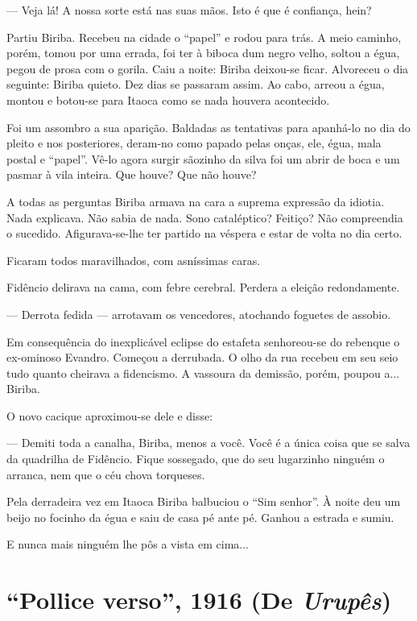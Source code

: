 --- Veja lá! A nossa sorte está nas suas mãos. Isto é que é confiança,
hein?

Partiu Biriba. Recebeu na cidade o ``papel'' e rodou para trás. A meio
caminho, porém, tomou por uma errada, foi ter à biboca dum negro velho,
soltou a égua, pegou de prosa com o gorila. Caiu a noite: Biriba
deixou-se ficar. Alvoreceu o dia seguinte: Biriba quieto. Dez dias se
passaram assim. Ao cabo, arreou a égua, montou e botou-se para Itaoca
como se nada houvera acontecido.

Foi um assombro a sua aparição. Baldadas as tentativas para apanhá-lo no
dia do pleito e nos posteriores, deram-no como papado pelas onças, ele,
égua, mala postal e ``papel''. Vê-lo agora surgir sãozinho da silva foi
um abrir de boca e um pasmar à vila inteira. Que houve? Que não houve?

A todas as perguntas Biriba armava na cara a suprema expressão da
idiotia. Nada explicava. Não sabia de nada. Sono cataléptico? Feitiço?
Não compreendia o sucedido. Afigurava-se-lhe ter partido na véspera e
estar de volta no dia certo.

Ficaram todos maravilhados, com asníssimas caras.

Fidêncio delirava na cama, com febre cerebral. Perdera a eleição
redondamente.

--- Derrota fedida --- arrotavam os vencedores, atochando foguetes de
assobio.

Em consequência do inexplicável eclipse do estafeta senhoreou-se do
rebenque o ex-ominoso Evandro. Começou a derrubada. O olho da rua
recebeu em seu seio tudo quanto cheirava a fidencismo. A vassoura da
demissão, porém, poupou a... Biriba.

O novo cacique aproximou-se dele e disse:

--- Demiti toda a canalha, Biriba, menos a você. Você é a única coisa
que se salva da quadrilha de Fidêncio. Fique sossegado, que do seu
lugarzinho ninguém o arranca, nem que o céu chova torqueses.

Pela derradeira vez em Itaoca Biriba balbuciou o ``Sim senhor''. À noite
deu um beijo no focinho da égua e saiu de casa pé ante pé. Ganhou a
estrada e sumiu.

E nunca mais ninguém lhe pôs a vista em cima...

\chapter{``Pollice verso'', 1916 (De \emph{Urupês})}

